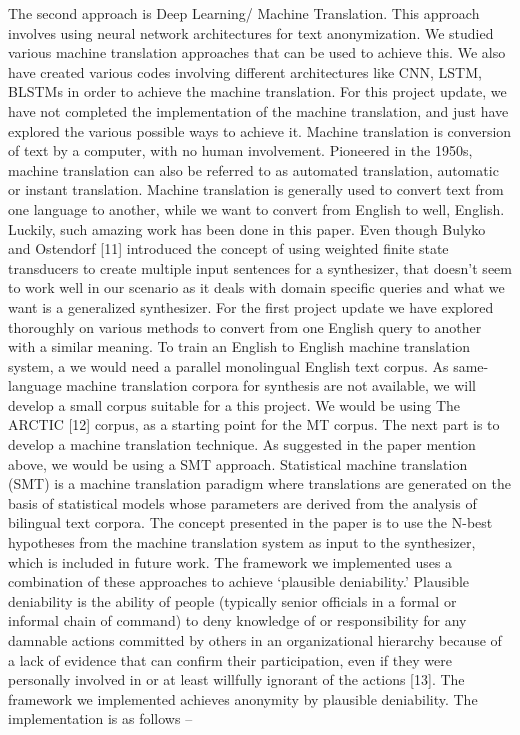 \documentclass[10pt, a4paper, twocolumn]{article} %
\begin{document}
The second approach is Deep Learning/ Machine Translation. This approach involves using neural network architectures for text anonymization. We studied various machine translation approaches that can be used to achieve this. We also have created various codes involving different architectures like CNN, LSTM, BLSTMs in order to achieve the machine translation. For this project update, we have not completed the implementation of the machine translation, and just have explored the various possible ways to achieve it. Machine translation is conversion of text by a computer, with no human involvement. Pioneered in the 1950s, machine translation can also be referred to as automated translation, automatic or instant translation. Machine translation is generally used to convert text from one language to another, while we want to convert from English to well, English. Luckily, such amazing work has been done in this paper. Even though Bulyko and Ostendorf [11] introduced the concept of using weighted finite state transducers to create multiple input sentences for a synthesizer, that doesn’t seem to work well in our scenario as it deals with domain specific queries and what we want is a generalized synthesizer. For the first project update we have explored thoroughly on various methods to convert from one English query to another with a similar meaning. To train an English to English machine translation system, a we would need a parallel monolingual English text corpus. As same-language machine translation corpora for synthesis are not available, we will develop a small corpus suitable for a this project. We would be using The ARCTIC [12] corpus, as a starting point for the MT corpus.\newline
The next part is to develop a machine translation technique. As suggested in the paper mention above, we would be using a SMT approach. Statistical machine translation (SMT) is a machine translation paradigm where translations are generated on the basis of statistical models whose parameters are derived from the analysis of bilingual text corpora. The concept presented in the paper is to use the N-best hypotheses from the machine translation system as input to the synthesizer, which is included in future work. \newline
The framework we implemented uses a combination of these approaches to achieve ‘plausible deniability.’ Plausible deniability is the ability of people (typically senior officials in a formal or informal chain of command) to deny knowledge of or responsibility for any damnable actions committed by others in an organizational hierarchy because of a lack of evidence that can confirm their participation, even if they were personally involved in or at least willfully ignorant of the actions [13]. The framework we implemented achieves anonymity by plausible deniability. The implementation is as follows – 
\end{document}
